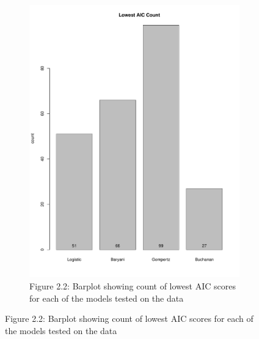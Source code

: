 \documentclass[11pt]{article}
\begin{document}
\begin{figure}[h!]
\begin{subfigure}[h]{0.4\textwidth}
        \includegraphics[scale=0.35]{../Results/bestfit_barplot.pdf}
        \caption{Figure 2.2: Barplot showing count of lowest AIC scores for each of the models tested on the data}
        \label{fig:AIC count}
    \end{subfigure}
\end{figure}
\end{document}
